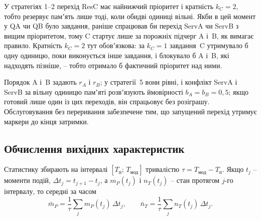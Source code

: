 У стратегіях 1--2 перехід ResC має найнижчий пріоритет і кратність $k_C=2$, тобто резервує
памʼять лише тоді, коли обидві одиниці вільні. Якби в цей момент у QA чи QB було завдання,
раніше спрацював би перехід ServA чи ServB з вищим пріоритетом, тому C стартує лише за порожніх
підчерг A і~B, як вимагає правило. Кратність $k_C=2$ тут обовʼязкова: за $k_C=1$ завдання~C
утримувало б одну одиницю, поки виконується інше завдання, і блокувало б A і~B, які
надходять пізніше, -- тобто отримало б фактичний пріоритет над ними.

Порядок A і~B задають $r_A$ і $r_B$; у стратегії~5 вони рівні, і конфлікт ServA і ServB за
вільну одиницю памʼяті розвʼязують ймовірності $b_A=b_B=0{,}5$; якщо готовий лише один із цих
переходів, він спрацьовує без розіграшу. Обслуговування без переривання
забезпечене тим, що запущений перехід утримує маркери до кінця затримки.

\subsection{Обчислення вихідних характеристик}

Статистику збирають на інтервалі $[T_{\text{п}};\,T_{\text{мод}}]$ тривалістю
$\tau=T_{\text{мод}}-T_{\text{п}}$. Якщо $t_j$ -- моменти подій, $\Delta t_j=t_{j+1}-t_j$, а
$m_P(t_j)$ і $n_T(t_j)$ -- стан протягом $j$-го інтервалу, то середні за часом
\begin{equation}\label{eq:time-means}
  \bar m_P = \frac{1}{\tau}\sum_j m_P(t_j)\,\Delta t_j, \qquad
  \bar n_T = \frac{1}{\tau}\sum_j n_T(t_j)\,\Delta t_j .
\end{equation}

